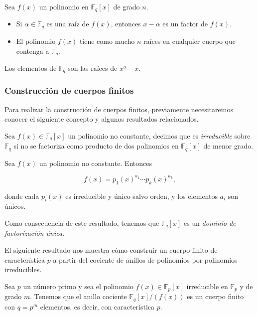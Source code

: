 \begin{proposition}
    Sea $f(x)$ un polinomio en $\mathbb{F}_q[x]$ de grado $n$.
    \begin{itemize}
        \item Si $\alpha \in \mathbb{F}_q$ es una raíz de $f(x)$, entonces $x - \alpha$ es un factor de $f(x)$.
        \item El polinomio $f(x)$ tiene como mucho $n$ raíces en cualquier cuerpo que contenga a $\mathbb{F}_q$.
    \end{itemize}
\end{proposition}

\begin{theorem}
    Los elementos de $\mathbb{F}_q$ son las raíces de $x^q - x$.
\end{theorem}

\subsubsection{Construcción de cuerpos finitos}

Para realizar la construcción de cuerpos finitos, previamente necesitaremos conocer el siguiente concepto y algunos resultados relacionados.

\begin{definition}
    Sea $f(x) \in \mathbb{F}_q[x]$ un polinomio no constante, decimos que es \emph{irreducible} sobre $\mathbb{F}_q$ si no se factoriza como producto de dos polinomios en $\mathbb{F}_q[x]$ de menor grado.
\end{definition}

\begin{theorem}
    Sea $f(x)$ un polinomio no constante. Entonces

    $$f(x) = p_1(x)^{a_1} \cdots p_k(x)^{a_k},$$

    donde cada $p_i(x)$ es irreducible y único salvo orden, y los elementos $a_i$ son únicos.
\end{theorem}

Como consecuencia de este resultado, tenemos que $\mathbb{F}_q[x]$ es un \emph{dominio de factorización única}.

El siguiente resultado nos muestra cómo construir un cuerpo finito de característica $p$ a partir del cociente de anillos de polinomios por polinomios irreducibles.

\begin{proposition}
    Sea $p$ un número primo y sea el polinomio $f(x) \in \mathbb{F}_p[x]$ irreducible en $\mathbb{F}_p$ y de grado $m$. Tenemos que el anillo cociente $\mathbb{F}_q[x]/\left(f(x)\right)$ es un cuerpo finito con $q = p^m$ elementos, es decir, con característica $p$.
\end{proposition}

